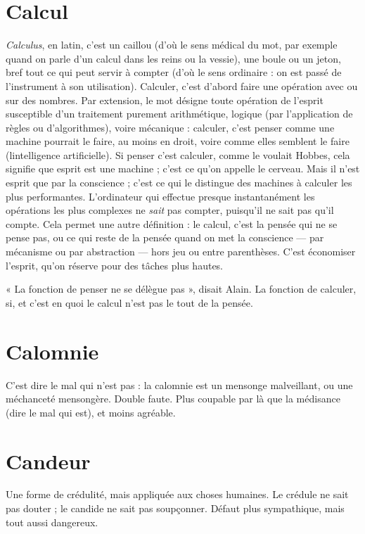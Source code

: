 \section{Calcul}
{\it Calculus}, en latin, c’est un caillou (d’où le sens médical du mot, par
exemple quand on parle d’un calcul dans les reins ou la vessie), une
boule ou un jeton, bref tout ce qui peut servir à compter (d’où le sens
ordinaire : on est passé de l'instrument à son utilisation). Calculer, c’est
d’abord faire une opération avec ou sur des nombres. Par extension, le mot
désigne toute opération de l'esprit susceptible d’un traitement purement arithmétique,
logique (par l'application de règles ou d’algorithmes), voire mécanique :
calculer, c’est penser comme une machine pourrait le faire, au moins en
droit, voire comme elles semblent le faire (lintelligence artificielle). Si penser
c’est calculer, comme le voulait Hobbes, cela signifie que esprit est une
machine ; c’est ce qu’on appelle le cerveau. Mais il n’est esprit que par la
conscience ; c’est ce qui le distingue des machines à calculer les plus performantes.
L'ordinateur qui effectue presque instantanément les opérations les
plus complexes ne {\it sait} pas compter, puisqu'il ne sait pas qu’il compte. Cela
permet une autre définition : le calcul, c’est la pensée qui ne se pense pas, ou ce
qui reste de la pensée quand on met la conscience — par mécanisme ou par abstraction —
hors jeu ou entre parenthèses. C’est économiser l'esprit, qu’on
réserve pour des tâches plus hautes.

« La fonction de penser ne se délègue pas », disait Alain. La fonction de calculer,
si, et c’est en quoi le calcul n’est pas le tout de la pensée.

\section{Calomnie}
C'est dire le mal qui n’est pas : la calomnie est un mensonge
malveillant, ou une méchanceté mensongère. Double faute.
Plus coupable par là que la médisance (dire le mal qui est), et moins agréable.

\section{Candeur}
Une forme de crédulité, mais appliquée aux choses humaines. Le
crédule ne sait pas douter ; le candide ne sait pas soupçonner.
Défaut plus sympathique, mais tout aussi dangereux.

